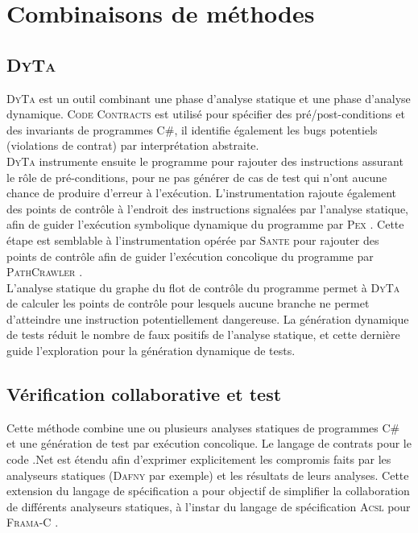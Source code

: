 
\chapter{Combinaisons de méthodes}

\section{\textsc{DyTa}}

\textsc{DyTa} \cite{DyTa} est un outil combinant une phase d'analyse statique et
une phase d'analyse dynamique. \textsc{Code Contracts} \cite{CodeContracts} est
utilisé pour spécifier des pré/post-conditions et des invariants de programmes
C\#, il identifie également les bugs potentiels (violations de contrat) par
interprétation abstraite.\\

\textsc{DyTa} instrumente ensuite le programme pour rajouter des instructions
assurant le rôle de pré-conditions, pour ne pas générer de cas de test qui n'ont
aucune chance de produire d'erreur à l'exécution. L'instrumentation rajoute
également des points de contrôle à l'endroit des instructions signalées par
l'analyse statique, afin de guider l'exécution symbolique dynamique du programme
par \textsc{Pex} \cite{PEX}. Cette étape est semblable à l'instrumentation
opérée par \textsc{Sante} \cite{SANTE} pour rajouter des points de contrôle afin
de guider l'exécution concolique du programme par \textsc{PathCrawler}
\cite{PathCrawler}.\\

L'analyse statique du graphe du flot de contrôle du programme permet à
\textsc{DyTa} de calculer les points de contrôle pour lesquels aucune branche ne
permet d'atteindre une instruction potentiellement dangereuse. La génération
dynamique de tests réduit le nombre de faux positifs de l'analyse statique, et
cette dernière guide l'exploration pour la génération dynamique de tests.

\section{Vérification collaborative et test}

Cette méthode \cite{collaborative-verification} combine une ou plusieurs
analyses statiques de programmes C\# et une génération de test par exécution
concolique. Le langage de contrats pour le code .Net est étendu afin d'exprimer
explicitement les compromis faits par les analyseurs statiques (\textsc{Dafny}
\cite{Dafny} par exemple) et les résultats de leurs analyses. Cette extension du
langage de spécification a pour objectif de simplifier la collaboration de
différents analyseurs statiques, à l'instar du langage de spécification
\textsc{Acsl} \cite{ACSL} pour \textsc{Frama-C} \cite{Frama-C}.\\

